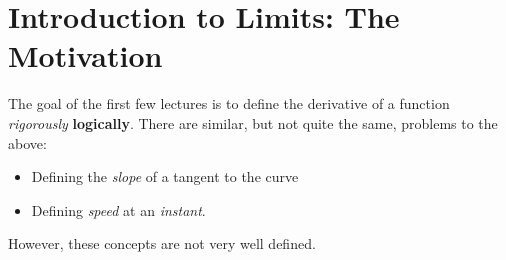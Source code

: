\section{Introduction to Limits: The Motivation}

\begin{idea}
    The goal of the first few lectures is to define the derivative of a function \textit{rigorously} \textbf{logically}. There are similar, but not quite the same, problems to the above:
    \begin{itemize}
        \item Defining the \emph{slope} of a tangent to the curve
        \item Defining \emph{speed} at an \textit{instant}.
    \end{itemize}
    However, these concepts are not very well defined.
\end{idea}
